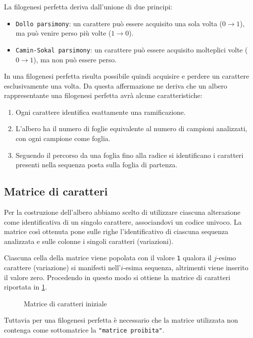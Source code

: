 \documentclass[11pt,italian]{article}
\begin{document}
\noindent
La filogenesi perfetta deriva dall'unione di due principi:
\begin{itemize}
	\item \lstinline{Dollo parsimony}: un carattere può essere acquisito una sola volta ($0 \to 1$), ma può venire perso più volte ($1 \to 0$).
	\item \lstinline{Camin-Sokal parsimony}: un carattere può essere acquisito molteplici volte ($0 \to 1$), ma non può essere perso.
\end{itemize}
In una filogenesi perfetta risulta possibile quindi acquisire e perdere un carattere esclusivamente una volta.
Da questa affermazione ne deriva che un albero rappresentante una filogenesi perfetta avrà alcune caratteristiche:
\begin{enumerate}
	\item Ogni carattere identifica esattamente una ramificazione.
	\item L'albero ha il numero di foglie equivalente al numero di campioni analizzati, con ogni campione come foglia.
	\item Seguendo il percorso da una foglia fino alla radice si identificano i caratteri presenti nella sequenza posta sulla foglia di partenza.
\end{enumerate}

\subsection{Matrice di caratteri}
Per la costruzione dell'albero abbiamo scelto di utilizzare ciascuna alterazione come identificativa di un singolo carattere, associandovi un codice univoco. La matrice così ottenuta pone sulle righe l'identificativo di ciascuna sequenza analizzata e sulle colonne i singoli caratteri (variazioni).

Ciascuna cella della matrice viene popolata con il valore \lstinline{1} qualora il $j$-esimo carattere (variazione) si manifesti nell'$i$-esima sequenza, altrimenti viene inserito il valore zero. Procedendo in questo modo si ottiene la matrice di caratteri riportata in \cref{fig:matrix-characters}.

\begin{figure}[H]
  \caption{Matrice di caratteri iniziale}
  \label{fig:matrix-characters}
\end{figure}
\noindent
Tuttavia per una filogenesi perfetta è necessario che la matrice utilizzata non contenga come sottomatrice la \lstinline{"matrice proibita"}.
\end{document}
